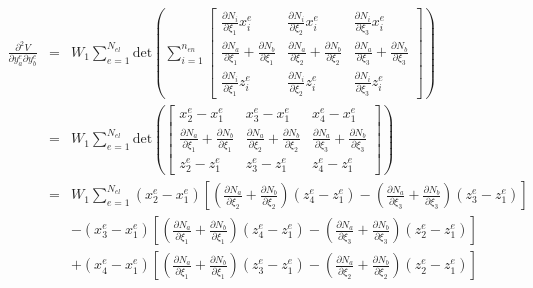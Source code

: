 \begin{eqnarray}
\frac{\partial^2 V}{\partial y_a^e \partial y_b^e} &=& W_1\sum_{e=1}^{N_{el}} \text{det}\left(\sum_{i=1}^{n_{en}} \begin{bmatrix}
\frac{\partial N_i}{\partial \xi_1}x_i^e  & \frac{\partial N_i}{\partial \xi_2}x_i^e  & \frac{\partial N_i}{\partial \xi_3}x_i^e  \\
%
\frac{\partial N_a}{\partial \xi_1}+\frac{\partial N_b}{\partial \xi_1} & \frac{\partial N_a}{\partial \xi_2}+\frac{\partial N_b}{\partial \xi_2}& \frac{\partial N_a}{\partial \xi_3}+\frac{\partial N_b}{\partial \xi_3} \\
%
\frac{\partial N_i}{\partial \xi_1}z_i^e & \frac{\partial N_i}{\partial \xi_2}z_i^e & \frac{\partial N_i}{\partial \xi_3}z_i^e 
\end{bmatrix}\right) \nonumber\\
&=& W_1\sum_{e=1}^{N_{el}} \text{det}\left( \begin{bmatrix}
x_2^e - x_1^e & x_3^e - x_1^e & x_4^e - x_1^e \\
%
\frac{\partial N_a}{\partial \xi_1}+\frac{\partial N_b}{\partial \xi_1} & \frac{\partial N_a}{\partial \xi_2}+\frac{\partial N_b}{\partial \xi_2}& \frac{\partial N_a}{\partial \xi_3}+\frac{\partial N_b}{\partial \xi_3} \\
%
z_2^e - z_1^e & z_3^e - z_1^e & z_4^e - z_1^e 
\end{bmatrix}\right) \nonumber\\
%
&=&W_1\sum_{e=1}^{N_{el}}(x_2^e - x_1^e)\left[\left(\frac{\partial N_a}{\partial \xi_2}+\frac{\partial N_b}{\partial \xi_2}\right)(z_4^e - z_1^e)-\left(\frac{\partial N_a}{\partial \xi_3}+\frac{\partial N_b}{\partial \xi_3}\right)(z_3^e - z_1^e)\right] \nonumber\\
%
&&-(x_3^e - x_1^e)\left[\left(\frac{\partial N_a}{\partial \xi_1}+\frac{\partial N_b}{\partial \xi_1}\right)(z_4^e - z_1^e)-\left(\frac{\partial N_a}{\partial \xi_3}+\frac{\partial N_b}{\partial \xi_3}\right)(z_2^e - z_1^e)\right] \nonumber\\
%
&&+(x_4^e - x_1^e)\left[\left(\frac{\partial N_a}{\partial \xi_1}+\frac{\partial N_b}{\partial \xi_1}\right)(z_3^e - z_1^e)-\left(\frac{\partial N_a}{\partial \xi_2}+\frac{\partial N_b}{\partial \xi_2}\right)(z_2^e - z_1^e)\right] 
\end{eqnarray}
